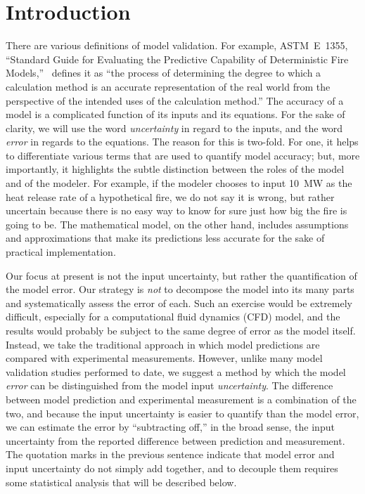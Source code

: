 
\section{Introduction}

There are various definitions of model validation.
For example, ASTM~E~1355, ``Standard Guide for Evaluating the Predictive Capability of
Deterministic Fire Models,''~\cite{ASTM:E1355} defines it as ``the process of determining the degree to which a calculation method
is an accurate representation of the real world from the perspective of the intended uses of the calculation method.''
The accuracy of a model is a complicated function of its inputs and its equations.
For the sake of clarity, we will use the word {\em uncertainty} in regard to the inputs, and the word {\em error} in regards
to the equations. The reason for this is two-fold. For one,
it helps to differentiate various terms that are used to quantify model accuracy; but, more importantly, it highlights the subtle distinction between the roles of the model
and of the modeler. For example, if the modeler chooses to input 10~MW as the heat release rate of a hypothetical fire, we do not say it is wrong, but rather uncertain because there
is no easy way to know for sure just how big the fire is going to be. The mathematical model, on the other hand, includes assumptions and approximations that make its predictions less
accurate for the sake of practical implementation.

Our focus at present is not the input uncertainty, but rather the quantification of the model error.
Our strategy is {\em not} to decompose the model into its many parts and systematically assess
the error of each. Such an exercise would be extremely difficult, especially for a computational fluid dynamics (CFD) model, and the results would probably be subject to the same
degree of error as the model itself. Instead, we take the traditional approach in which model predictions are compared with experimental measurements. However, unlike many
model validation studies performed to date, we suggest a method by which the model {\em error} can be distinguished from the model input {\em uncertainty}. The difference
between model prediction and experimental measurement is a combination of the two, and because the input
uncertainty is easier to quantify than the model error, we can estimate the error by ``subtracting off,'' in the broad sense, the input uncertainty from the reported
difference between prediction and measurement. The quotation marks in the previous sentence indicate that model error and input uncertainty do not simply add together,
and to decouple them requires some statistical analysis that will be described below.


